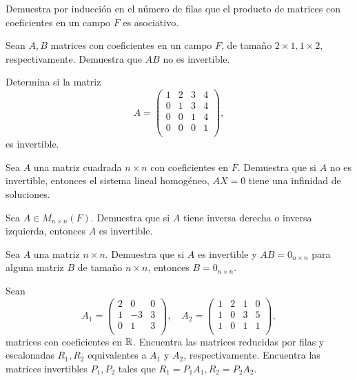 \documentclass[12pt,a4paper]{book}
\begin{document}
    \begin{ejercicio}
        Demuestra por inducción en el número de filas que el producto de matrices con coeficientes en un campo $F$ es asociativo.
    \end{ejercicio}

    \begin{ejercicio}
        Sean $A,B$ matrices con coeficientes en un campo $F$, de tamaño $2 \times 1, 1 \times 2$, respectivamente. Demuestra que $AB$ no es invertible.
    \end{ejercicio}

    \begin{ejercicio}
        Determina si la matriz
        \[
        A =
        \begin{pmatrix}
            1 & 2 & 3 & 4\\
            0 & 1 & 3 & 4\\
            0 & 0 & 1 & 4\\
            0 & 0 & 0 & 1\\
        \end{pmatrix},
        \]
        es invertible.
    \end{ejercicio}

    \begin{ejercicio}
        Sea $A$ una matriz cuadrada $n \times n$ con coeficientes en $F$. Demuestra que si $A$ no es invertible, entonces el sistema lineal homogéneo, $AX = 0$ tiene una infinidad de soluciones.
    \end{ejercicio}

    \begin{ejercicio}
        Sea $A \in M_{n \times n}(F)$. Demuestra que si $A$ tiene inversa derecha o inversa izquierda, entonces $A$ es invertible.
    \end{ejercicio}

    \begin{ejercicio}
        Sea $A$ una matriz $n \times n$. Demuestra que si $A$ es invertible y $AB = 0_{n \times n}$ para alguna matriz $B$ de tamaño $n \times n$, entonces $B = 0_{n \times n}$.
    \end{ejercicio}

    \begin{ejercicio}
        Sean
        \[
        A_1 =
        \begin{pmatrix}
            2 & 0 & 0\\
            1 & -3 & 3\\
            0 & 1 & 3\\
        \end{pmatrix}
        , \quad A_2 =
        \begin{pmatrix}
            1 & 2 & 1 & 0\\
            1 & 0 & 3 & 5\\
            1 & 0 & 1 & 1\\
        \end{pmatrix}
        ,
        \]
        matrices con coeficientes en $\mathbb{R}$. Encuentra las matrices reducidas por filas y escalonadas $R_1, R_2$ equivalentes a $A_1$ y $A_2$, respectivamente. Encuentra las matrices invertibles $P_1, P_2$ tales que $R_1 = P_1A_1, R_2 = P_2 A_2$.
    \end{ejercicio}
\end{document}
